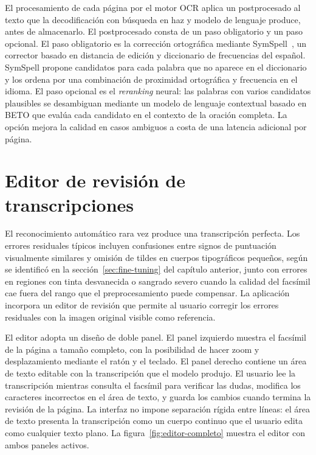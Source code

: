 El procesamiento de cada página por el motor OCR aplica un postprocesado al texto que la decodificación con búsqueda en haz y modelo de lenguaje produce, antes de almacenarlo. El postprocesado consta de un paso obligatorio y un paso opcional. El paso obligatorio es la corrección ortográfica mediante SymSpell~\cite{garbe2012symspell}, un corrector basado en distancia de edición y diccionario de frecuencias del español. SymSpell propone candidatos para cada palabra que no aparece en el diccionario y los ordena por una combinación de proximidad ortográfica y frecuencia en el idioma. El paso opcional es el \textit{reranking} neural: las palabras con varios candidatos plausibles se desambiguan mediante un modelo de lenguaje contextual basado en BETO que evalúa cada candidato en el contexto de la oración completa. La opción mejora la calidad en casos ambiguos a costa de una latencia adicional por página.

\section{Editor de revisión de transcripciones}
\label{sec:editor}

El reconocimiento automático rara vez produce una transcripción perfecta. Los errores residuales típicos incluyen confusiones entre signos de puntuación visualmente similares y omisión de tildes en cuerpos tipográficos pequeños, según se identificó en la sección~\ref{sec:fine-tuning} del capítulo anterior, junto con errores en regiones con tinta desvanecida o sangrado severo cuando la calidad del facsímil cae fuera del rango que el preprocesamiento puede compensar. La aplicación incorpora un editor de revisión que permite al usuario corregir los errores residuales con la imagen original visible como referencia.

El editor adopta un diseño de doble panel. El panel izquierdo muestra el facsímil de la página a tamaño completo, con la posibilidad de hacer zoom y desplazamiento mediante el ratón y el teclado. El panel derecho contiene un área de texto editable con la transcripción que el modelo produjo. El usuario lee la transcripción mientras consulta el facsímil para verificar las dudas, modifica los caracteres incorrectos en el área de texto, y guarda los cambios cuando termina la revisión de la página. La interfaz no impone separación rígida entre líneas: el área de texto presenta la transcripción como un cuerpo continuo que el usuario edita como cualquier texto plano. La figura~\ref{fig:editor-completo} muestra el editor con ambos paneles activos.

